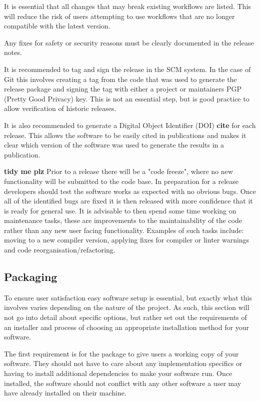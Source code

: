 \documentclass[jnr]{iosart2x}
\newcommand{\todo}[1]{\textbf{#1}}
\begin{document}
It is essential that all changes that may break existing workflows are listed.
This will reduce the risk of users attempting to use workflows that are no longer compatible with the latest version.

Any fixes for safety or security reasons must be clearly documented in the release notes.

It is recommended to tag and sign the release in the SCM system.
In the case of Git this involves creating a tag from the code that was used to generate the release package and signing the tag with either a project or maintainers PGP (Pretty Good Privacy) key.
This is not an essential step, but is good practice to allow verification of historic releases.

It is also recommended to generate a Digital Object Identifier (DOI) \todo{cite} for each release.
This allows the software to be easily cited in publications and makes it clear which version of the software was used to generate the results in a publication.

\todo{tidy me plz}
Prior to a release there will be a "code freeze", where no new functionality will be submitted to the code base.
In preparation for a release developers should test the software works as expected with no obvious bugs.
Once all of the identified bugs are fixed it is then released with more confidence that it is ready for general use.
It is advisable to then spend some time working on maintenance tasks, these are improvements to the maintainability of the code rather than any new user facing functionality.
Examples of such tasks include: moving to a new compiler version, applying fixes for compiler or linter warnings and code reorganisation/refactoring.

\subsection{Packaging}
\label{Packaging}

To ensure user satisfaction easy software setup is essential, but exactly what this involves varies depending on the nature of the project.
As such, this section will not go into detail about specific options, but rather set out the requirements of an installer and process of choosing an appropriate installation method for your software.

The first requirement is for the package to give users a working copy of your software.
They should not have to care about any implementation specifics or having to install additional dependencies to make your software run.
Once installed, the software should not conflict with any other software a user may have already installed on their machine.
\end{document}

